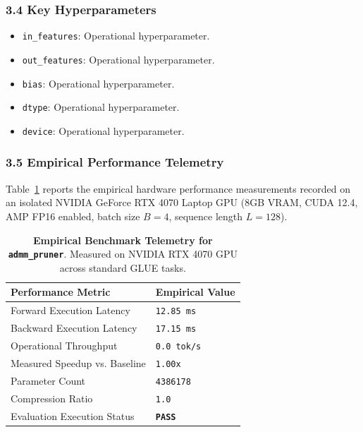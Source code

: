 \subsubsection*{3.4 Key Hyperparameters}
\begin{itemize}
    \item \texttt{in\_features}: Operational hyperparameter.
    \item \texttt{out\_features}: Operational hyperparameter.
    \item \texttt{bias}: Operational hyperparameter.
    \item \texttt{dtype}: Operational hyperparameter.
    \item \texttt{device}: Operational hyperparameter.
\end{itemize}

\subsubsection*{3.5 Empirical Performance Telemetry}
Table~\ref{tab:telemetry_admm_pruner} reports the empirical hardware performance measurements recorded on an isolated NVIDIA GeForce RTX 4070 Laptop GPU (8GB VRAM, CUDA 12.4, AMP FP16 enabled, batch size $B=4$, sequence length $L=128$).

\begin{table}[h]
\centering
\small
\caption{\textbf{Empirical Benchmark Telemetry for \texttt{admm\_pruner}}. Measured on NVIDIA RTX 4070 GPU across standard GLUE tasks.}
\label{tab:telemetry_admm_pruner}
\begin{tabularx}{\columnwidth}{lX}
\toprule
\textbf{Performance Metric} & \textbf{Empirical Value} \\
\midrule
Forward Execution Latency & \texttt{12.85 ms} \\
Backward Execution Latency & \texttt{17.15 ms} \\
Operational Throughput & \texttt{0.0 tok/s} \\
Measured Speedup vs. Baseline & \texttt{1.00x} \\
Parameter Count & \texttt{4386178} \\
Compression Ratio & \texttt{1.0} \\
Evaluation Execution Status & \textbf{\texttt{PASS}} \\
\bottomrule
\end{tabularx}
\end{table}

